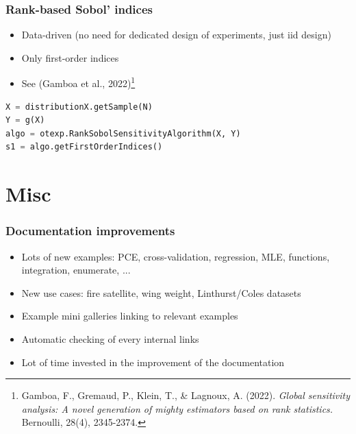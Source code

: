 \documentclass[aspectratio=169]{beamer}
\begin{document}
\begin{frame}[containsverbatim]
\frametitle{Rank-based Sobol' indices}

\begin{itemize}
\item Data-driven (no need for dedicated design of experiments, just iid design)
\item Only first-order indices
\item See (Gamboa et al., 2022)\footnote{Gamboa, F., Gremaud, P., Klein, T., \& 
Lagnoux, A. (2022). \emph{Global sensitivity analysis: A novel generation of mighty 
estimators based on rank statistics.} Bernoulli, 28(4), 2345-2374.}
\end{itemize}


\begin{small}
\begin{lstlisting}[language=Python]
X = distributionX.getSample(N)
Y = g(X)
algo = otexp.RankSobolSensitivityAlgorithm(X, Y)
s1 = algo.getFirstOrderIndices()
\end{lstlisting}
\end{small}

\end{frame}


\section{Misc}

\begin{frame}
\frametitle{Documentation improvements}
\begin{itemize}
\item Lots of new examples: PCE, cross-validation, regression, MLE, functions, 
integration, enumerate, ...
\item New use cases: fire satellite, wing weight, Linthurst/Coles datasets
\end{itemize}


\begin{itemize}
\item Example mini galleries linking to relevant examples
\item Automatic checking of every internal links
\item Lot of time invested in the improvement of the documentation
\end{itemize}
\end{frame}
\end{document}
